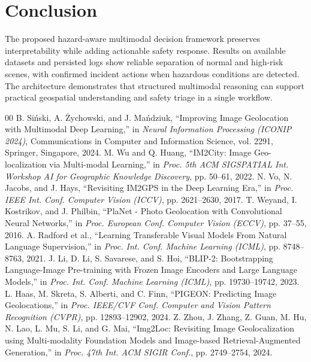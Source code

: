 \documentclass[10pt,conference]{IEEEtran}
\begin{document}
\section{Conclusion}

The proposed hazard-aware multimodal decision framework preserves interpretability while adding actionable safety response. Results on available datasets and persisted logs show reliable separation of normal and high-risk scenes, with confirmed incident actions when hazardous conditions are detected. The architecture demonstrates that structured multimodal reasoning can support practical geospatial understanding and safety triage in a single workflow.

\begin{thebibliography}{00}
 B. Siński, A. Żychowski, and J. Mańdziuk, ``Improving Image Geolocation with Multimodal Deep Learning,'' in \textit{Neural Information Processing (ICONIP 2024)}, Communications in Computer and Information Science, vol. 2291, Springer, Singapore, 2024.
 M. Wu and Q. Huang, ``IM2City: Image Geo-localization via Multi-modal Learning,'' in \textit{Proc. 5th ACM SIGSPATIAL Int. Workshop AI for Geographic Knowledge Discovery}, pp. 50--61, 2022.
 N. Vo, N. Jacobs, and J. Hays, ``Revisiting IM2GPS in the Deep Learning Era,'' in \textit{Proc. IEEE Int. Conf. Computer Vision (ICCV)}, pp. 2621--2630, 2017.
 T. Weyand, I. Kostrikov, and J. Philbin, ``PlaNet - Photo Geolocation with Convolutional Neural Networks,'' in \textit{Proc. European Conf. Computer Vision (ECCV)}, pp. 37--55, 2016.
 A. Radford et al., ``Learning Transferable Visual Models From Natural Language Supervision,'' in \textit{Proc. Int. Conf. Machine Learning (ICML)}, pp. 8748--8763, 2021.
 J. Li, D. Li, S. Savarese, and S. Hoi, ``BLIP-2: Bootstrapping Language-Image Pre-training with Frozen Image Encoders and Large Language Models,'' in \textit{Proc. Int. Conf. Machine Learning (ICML)}, pp. 19730--19742, 2023.
 L. Haas, M. Skreta, S. Alberti, and C. Finn, ``PIGEON: Predicting Image Geolocations,'' in \textit{Proc. IEEE/CVF Conf. Computer and Vision Pattern Recognition (CVPR)}, pp. 12893--12902, 2024.
 Z. Zhou, J. Zhang, Z. Guan, M. Hu, N. Lao, L. Mu, S. Li, and G. Mai, ``Img2Loc: Revisiting Image Geolocalization using Multi-modality Foundation Models and Image-based Retrieval-Augmented Generation,'' in \textit{Proc. 47th Int. ACM SIGIR Conf.}, pp. 2749--2754, 2024.

\end{thebibliography}
\end{document}

